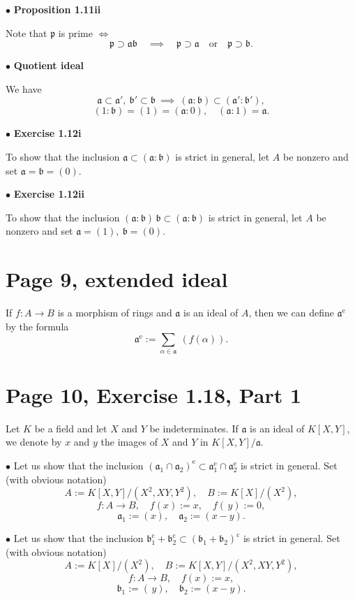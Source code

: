 \documentclass[12pt]{article}
\newcommand{\oo}{\operatorname}
\newcommand{\mf}{\mathfrak}
\newcommand{\bu}{\bullet}
\begin{document}

$\bu$ \textbf{\Large Proposition 1.11ii}%

Note that $\mf p$ is prime $\iff$
$$
\mf p\supset\mf a\mf b\quad\implies\quad\mf p\supset\mf a\quad\text{or}\quad\mf p\supset\mf b.
$$

$\bu$ \textbf{\Large Quotient ideal}%

We have 
$$
\mf a\subset\mf a',\ \mf b'\subset\mf b\ \implies\ (\mf a:\mf b)\subset(\mf a':\mf b'),
$$ 
$$
(1:\mf b)=(1)=(\mf a:0),\quad(\mf a:1)=\mf a.
$$

$\bu$ \textbf{\Large Exercise 1.12i}%

To show that the inclusion $\mf a\subset(\mf a:\mf b)$ is strict in general, let $A$ be nonzero and set $\mf a=\mf b=(0)$.

$\bu$ \textbf{\Large Exercise 1.12ii}%

To show that the inclusion $(\mf a\!:\!\mf b)\,\mf b\subset(\mf a:\mf b)$ is strict in general, let $A$ be nonzero and set $\mf a=(1),\ \mf b=(0)$.

\section{Page 9, extended ideal}%

If $f:A\to B$ is a morphism of rings and $\mf a$ is an ideal of $A$, then we can define $\mf a^{\oo e}$ by the formula
$$
\mf a^{\oo e}:=\sum_{\alpha\in\mf a}\ (f(\alpha)).
$$

\section{Page 10, Exercise 1.18, Part 1}%

Let $K$ be a field and let $X$ and $Y$ be indeterminates. If $\mf a$ is an ideal of $K[X,Y]$, we denote by $x$ and $y$ the images of $X$ and $Y$ in $K[X,Y]/\mf a$.

$\bu$ Let us show that the inclusion $(\mf a_1\cap\mf a_2)^{\oo e}\subset\mf a_1^{\oo e}\cap\mf a_2^{\oo e}$ is strict in general. Set (with obvious notation) 
$$
A:=K[X,Y]/(X^2,XY,Y^2),\quad B:=K[X]/(X^2),
$$ 
$$
f:A\to B,\quad f(x):=x,\quad f(\,y):=0,
$$ 
$$
\mf a_1:=(x),\quad\mf a_2:=(x-y).
$$

$\bu$ Let us show that the inclusion $\mf b_1^{\oo c}+\mf b_2^{\oo c}\subset(\mf b_1+\mf b_2)^{\oo c}$ is strict in general. Set (with obvious notation) 
$$
A:=K[X]/(X^2),\quad B:=K[X,Y]/(X^2,XY,Y^2),
$$ 
$$
f:A\to B,\quad f(x):=x,
$$ 
$$
\mf b_1:=(\,y),\quad\mf b_2:=(x-y).
$$
\end{document}
